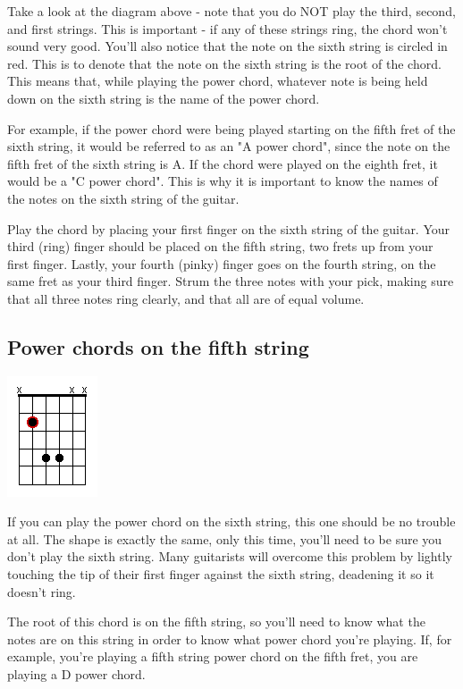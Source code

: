 Take a look at the diagram above - note that you do NOT play the third, second,
and first strings. This is important - if any of these strings ring, the chord
won't sound very good. You'll also notice that the note on the sixth string is
circled in red. This is to denote that the note on the sixth string is the root
of the chord. This means that, while playing the power chord, whatever note is
being held down on the sixth string is the name of the power chord.

For example, if the power chord were being played starting on the fifth fret of
the sixth string, it would be referred to as an "A power chord", since the note
on the fifth fret of the sixth string is A. If the chord were played on the
eighth fret, it would be a "C power chord". This is why it is important to know
the names of the notes on the sixth string of the guitar.

Play the chord by placing your first finger on the sixth string of the guitar.
Your third (ring) finger should be placed on the fifth string, two frets up
from your first finger. Lastly, your fourth (pinky) finger goes on the fourth
string, on the same fret as your third finger. Strum the three notes with your
pick, making sure that all three notes ring clearly, and that all are of equal
volume.

\subsection{Power chords on the fifth string}
\includegraphics{partfour/powerchord5.png}

If you can play the power chord on the sixth string, this one should be no
trouble at all. The shape is exactly the same, only this time, you'll need to
be sure you don't play the sixth string. Many guitarists will overcome this
problem by lightly touching the tip of their first finger against the sixth
string, deadening it so it doesn't ring.

The root of this chord is on the fifth string, so you'll need to know what the
notes are on this string in order to know what power chord you're playing. If,
for example, you're playing a fifth string power chord on the fifth fret, you
are playing a D power chord.

